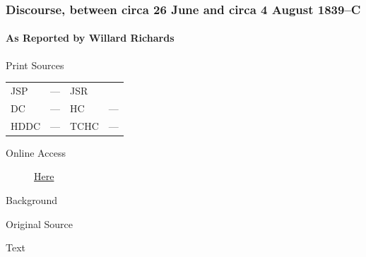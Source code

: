		\subsubsection{Discourse, between circa 26 June and circa 4 August 1839--C}
			\label{EMS-1839-JS-CIR-26-JUN-CIR-4-AUG-1839-C}
			
			\paragraph{As Reported by Willard Richards}
				\label{EMS-1839-JS-CIR-26-JUN-CIR-4-AUG-1839-C-WR}
				
				\begin{description}
					\item[Print Sources]
				\end{description}

					\begin{tabular}{p{0.5in}p{1in}p{0.5in}p{1in}}
					JSP	 	& ---		& JSR 		&  \\
					DC	 	& ---		& HC 		& --- \\
					HDDC 	& ---		& TCHC 		& --- \\
					\end{tabular}
				
				\begin{description}
					\item[Online Access] \href{https://www.josephsmithpapers.org/paper-summary/discourse-between-circa-26-june-and-circa-4-august-1839-c-as-reported-by-willard-richards/1}{Here}
				\end{description}
				
				\begin{description}
					\item[Background]
				\end{description}
				
				
				\begin{description}
					\item[Original Source]
				\end{description}
				
				
				\begin{description}
					\item[Text]
				\end{description}
				
